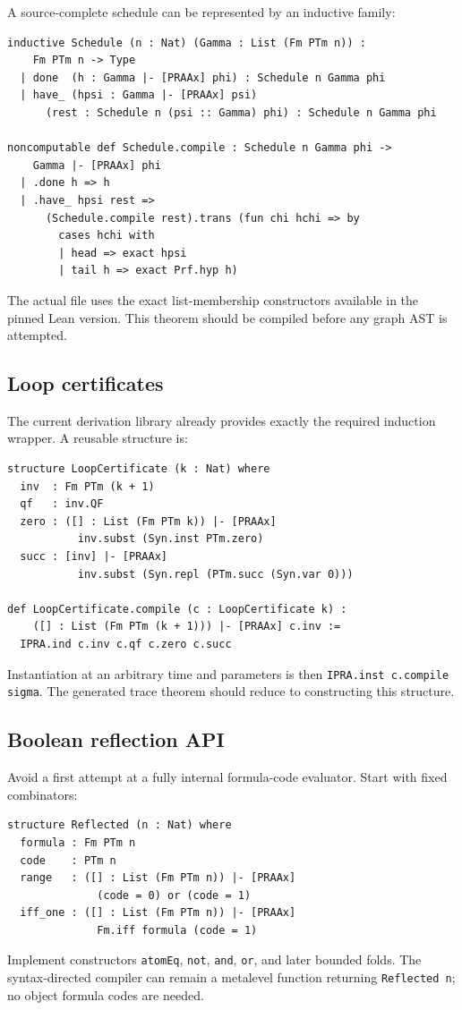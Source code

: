 A source-complete schedule can be represented by an inductive family:

\begin{lstlisting}
inductive Schedule (n : Nat) (Gamma : List (Fm PTm n)) :
    Fm PTm n -> Type
  | done  (h : Gamma |- [PRAAx] phi) : Schedule n Gamma phi
  | have_ (hpsi : Gamma |- [PRAAx] psi)
      (rest : Schedule n (psi :: Gamma) phi) : Schedule n Gamma phi

noncomputable def Schedule.compile : Schedule n Gamma phi ->
    Gamma |- [PRAAx] phi
  | .done h => h
  | .have_ hpsi rest =>
      (Schedule.compile rest).trans (fun chi hchi => by
        cases hchi with
        | head => exact hpsi
        | tail h => exact Prf.hyp h)
\end{lstlisting}
The actual file uses the exact list-membership constructors available in the pinned Lean version.  This theorem should be compiled before any graph AST is attempted.

\subsection{Loop certificates}

The current derivation library already provides exactly the required induction wrapper.  A reusable structure is:

\begin{lstlisting}
structure LoopCertificate (k : Nat) where
  inv  : Fm PTm (k + 1)
  qf   : inv.QF
  zero : ([] : List (Fm PTm k)) |- [PRAAx]
           inv.subst (Syn.inst PTm.zero)
  succ : [inv] |- [PRAAx]
           inv.subst (Syn.repl (PTm.succ (Syn.var 0)))

def LoopCertificate.compile (c : LoopCertificate k) :
    ([] : List (Fm PTm (k + 1))) |- [PRAAx] c.inv :=
  IPRA.ind c.inv c.qf c.zero c.succ
\end{lstlisting}
Instantiation at an arbitrary time and parameters is then \texttt{IPRA.inst c.compile sigma}.  The generated trace theorem should reduce to constructing this structure.

\subsection{Boolean reflection API}

Avoid a first attempt at a fully internal formula-code evaluator.  Start with fixed combinators:

\begin{lstlisting}
structure Reflected (n : Nat) where
  formula : Fm PTm n
  code    : PTm n
  range   : ([] : List (Fm PTm n)) |- [PRAAx]
              (code = 0) or (code = 1)
  iff_one : ([] : List (Fm PTm n)) |- [PRAAx]
              Fm.iff formula (code = 1)
\end{lstlisting}
Implement constructors \texttt{atomEq}, \texttt{not}, \texttt{and}, \texttt{or}, and later bounded folds.  The syntax-directed compiler can remain a metalevel function returning \texttt{Reflected n}; no object formula codes are needed.

